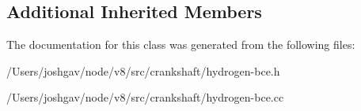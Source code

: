 \subsection*{Additional Inherited Members}


The documentation for this class was generated from the following files\+:\begin{DoxyCompactItemize}
\item 
/\+Users/joshgav/node/v8/src/crankshaft/hydrogen-\/bce.\+h\item 
/\+Users/joshgav/node/v8/src/crankshaft/hydrogen-\/bce.\+cc\end{DoxyCompactItemize}
